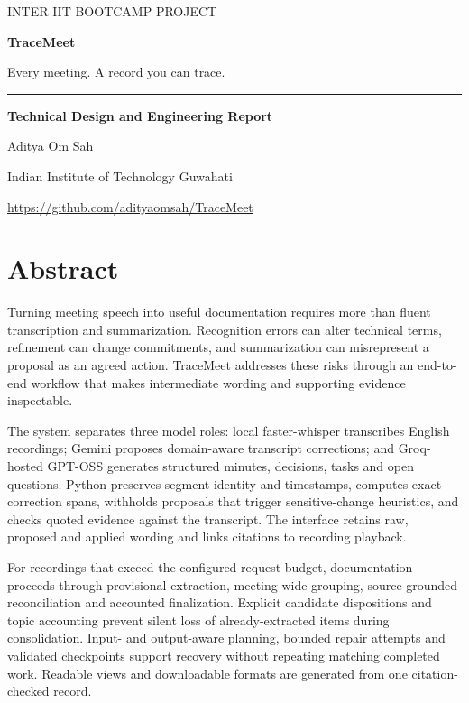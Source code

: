 \documentclass[11pt,a4paper]{article}
\begin{document}
\begin{titlepage}
\centering
\vspace*{22mm}
{\large\textcolor{accent}{INTER IIT BOOTCAMP PROJECT}}\par
\vspace{30mm}
{\fontsize{42}{48}\selectfont\bfseries\textcolor{ink}{TraceMeet}}\par
\vspace{9mm}
{\Large Every meeting. A record you can trace.}\par
\vspace{12mm}
{\color{accent}\rule{0.48\textwidth}{0.8pt}}
\vfill
{\large\textbf{Technical Design and Engineering Report}}\par
\vspace{7mm}
{\Large Aditya Om Sah}\par
\vspace{3mm}
{\large Indian Institute of Technology Guwahati}\par
\vspace{7mm}
{\small\url{https://github.com/adityaomsah/TraceMeet}}\par
\vspace{12mm}
\end{titlepage}

\section*{Abstract}
Turning meeting speech into useful documentation requires more than fluent transcription and summarization. Recognition errors can alter technical terms, refinement can change commitments, and summarization can misrepresent a proposal as an agreed action. TraceMeet addresses these risks through an end-to-end workflow that makes intermediate wording and supporting evidence inspectable.

The system separates three model roles: local faster-whisper transcribes English recordings; Gemini proposes domain-aware transcript corrections; and Groq-hosted GPT-OSS generates structured minutes, decisions, tasks and open questions. Python preserves segment identity and timestamps, computes exact correction spans, withholds proposals that trigger sensitive-change heuristics, and checks quoted evidence against the transcript. The interface retains raw, proposed and applied wording and links citations to recording playback.

For recordings that exceed the configured request budget, documentation proceeds through provisional extraction, meeting-wide grouping, source-grounded reconciliation and accounted finalization. Explicit candidate dispositions and topic accounting prevent silent loss of already-extracted items during consolidation. Input- and output-aware planning, bounded repair attempts and validated checkpoints support recovery without repeating matching completed work. Readable views and downloadable formats are generated from one citation-checked record.
\end{document}
